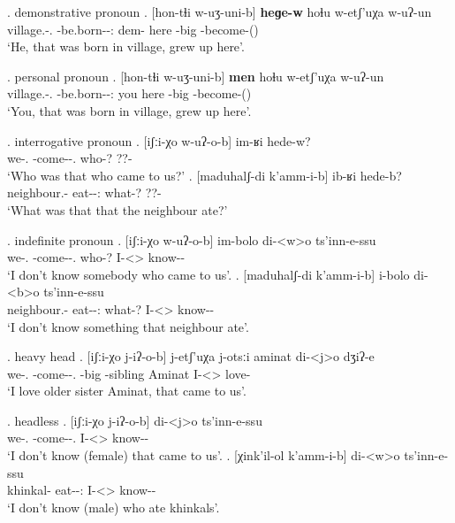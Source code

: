 \ex. demonstrative pronoun
	\ag. [hon-tɬi w-uʒ-uni-b] \textbf{heɡe-w} hoɬu w-etʃ'uχa w-uʔ-un\\
			{village.\Obl-\Inter.\Ess} {\M-be.born-\Pst-\Ptcp:\Pst} {dem-\M} here {\M-big} {\M-become-\Pst(\Aor)}\\
			\glt `He, that was born in village, grew up here'.

\ex. personal pronoun
	\ag. [hon-tɬi w-uʒ-uni-b] \textbf{men} hoɬu w-etʃ'uχa w-uʔ-un\\
			{village.\Obl-\Inter.\Ess} {\M-be.born-\Pst-\Ptcp:\Pst} you here {\M-big} {\M-become-\Pst(\Aor)}\\
			\glt `You, that was born in village, grew up here'.
			
\ex. interrogative pronoun
	\ag. [iʃːi-χo w-uʔ-o-b] im-ʁi hede-w?\\
			{we-\Add.\Lat} {\M-come-\Pst-\Ptcp.\Pst} {who-?} {??-\M}\\
			\glt `Who was that who came to us?'
	\bg. [maduhalʃ-di k'amm-i-b] ib-ʁi hede-b?\\
			{neighbour.\Obl-\Erg} {eat-\Pst-\Ptcp:\Pst} {what-?} {??-\Nanf}\\
			\glt `What was that that the neighbour ate?'
		
\ex. indefinite pronoun
	\ag.  [iʃːi-χo w-uʔ-o-b] im-bolo di-<w>o  ts'inn-e-ssu\\
			{we-\Add.\Lat} {\M-come-\Pst-\Ptcp.\Pst} {who-?} {I-<\M>\Aff} {know-\Hab-\Neg}\\
			\glt `I don't know somebody who came to us'.
	\bg.  [maduhalʃ-di k'amm-i-b] i-bolo di-<b>o  ts'inn-e-ssu\\
			{neighbour.\Obl-\Erg} {eat-\Pst-\Ptcp:\Pst} {what-?} {I-<\M>\Aff} {know-\Hab-\Neg}\\
			\glt `I don't know something that neighbour ate'.

\ex. heavy head
	\ag.  [iʃːi-χo j-iʔ-o-b] j-etʃ'uχa j-otsːi aminat di-<j>o dʒiʔ-e\\
			{we-\Add.\Lat} {\F-come-\Pst-\Ptcp.\Pst} {\F-big} {\F-sibling} Aminat {I-<\F>\Aff} {love-\Hab}\\
			\glt `I love older sister Aminat, that came to us'.

\ex. headless
	\ag.  [iʃːi-χo j-iʔ-o-b] di-<j>o ts'inn-e-ssu\\
			{we-\Add.\Lat} {\F-come-\Pst-\Ptcp.\Pst} {I-<\F>\Aff} {know-\Hab-\Neg}\\
			\glt `I don't know (female) that came to us'.
	\bg.  [χink'il-ol k'amm-i-b] di-<w>o ts'inn-e-ssu\\
			{khinkal-\Pl} {eat-\Pst-\Ptcp:\Pst} {I-<\M>\Aff} {know-\Hab-\Neg}\\
			\glt `I don't know (male) who ate khinkals'.

